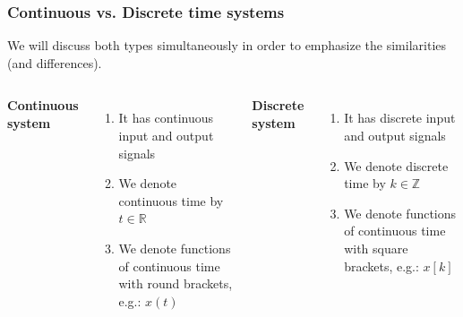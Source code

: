 \documentclass{beamer}
\begin{document}
\begin{frame}
\frametitle{Continuous vs. Discrete time systems}
\vspace{-2ex}
We will discuss both types simultaneously in order to emphasize the similarities (and differences).\\
\medskip
\begin{columns}[c] 

\center \textbf{Continuous system}
\begin{enumerate}
\item It has continuous input and output signals
\item We denote continuous time by $t \in \mathds{R}$
\item We denote functions of continuous time with round brackets, e.g.: $x(t)$
\end{enumerate}

\center \textbf{Discrete system}
\begin{enumerate}
\item It has discrete input and output signals
\item We denote discrete time by $k \in \mathds{Z}$
\item We denote functions of continuous time with square brackets, e.g.: $x[k]$
\end{enumerate}

\end{columns}
\end{frame}

\end{document}
